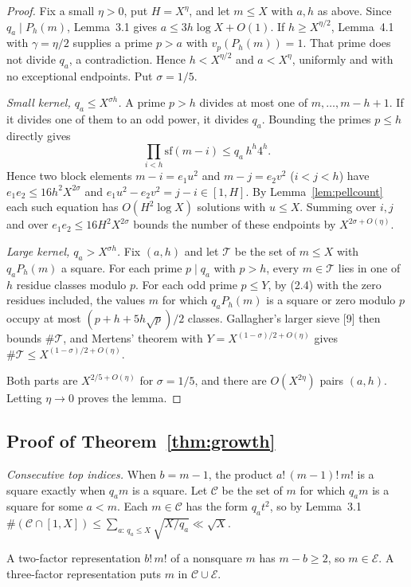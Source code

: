 \documentclass[letterpaper]{article}
\theoremstyle{definition}
\theoremstyle{remark}
\numberwithin{equation}{section}
\begin{document}
\begin{proof}
Fix a small $\eta>0$, put $H=X^\eta$, and let $m\le X$ with $a,h$ as above. Since $q_a\mid P_h(m)$,
Lemma~3.1 gives $a\le 3h\log X+O(1)$. If $h\ge X^{\eta/2}$, Lemma~4.1 with $\gamma=\eta/2$ supplies
a prime $p>a$ with $v_p(P_h(m))=1$. That prime does not divide $q_a$, a contradiction. Hence
$h<X^{\eta/2}$ and $a<X^{\eta}$, uniformly and with no exceptional endpoints. Put $\sigma=1/5$.

\emph{Small kernel, $q_a\le X^{\sigma h}$.} A prime $p>h$ divides at most one of $m,\dots,m-h+1$.
If it divides one of them to an odd power, it divides $q_a$. Bounding the primes $p\le h$ directly gives
\[ \prod_{i<h}\mathrm{sf}(m-i)\le q_a\,h^h4^h. \]
Hence two block elements $m-i=e_1u^2$ and $m-j=e_2v^2$ ($i<j<h$) have
$e_1e_2\le 16h^2X^{2\sigma}$ and $e_1u^2-e_2v^2=j-i\in[1,H]$. By Lemma~\ref{lem:pellcount} each such
equation has $O(H^2\log X)$ solutions with $u\le X$. Summing over $i,j$ and over
$e_1e_2\le 16H^2X^{2\sigma}$ bounds the number of these endpoints by $X^{2\sigma+O(\eta)}$.

\emph{Large kernel, $q_a>X^{\sigma h}$.} Fix $(a,h)$ and let $\mathcal T$ be the set of $m\le X$ with
$q_aP_h(m)$ a square. For each prime $p\mid q_a$ with $p>h$, every $m\in\mathcal T$ lies in one of $h$
residue classes modulo $p$. For each odd prime $p\le Y$, by (2.4) with the zero residues included, the
values $m$ for which $q_aP_h(m)$ is a square or zero modulo $p$ occupy at most
$(p+h+5h\sqrt p)/2$ classes. Gallagher's larger sieve [9] then bounds $\#\mathcal T$, and Mertens'
theorem with $Y=X^{(1-\sigma)/2+O(\eta)}$ gives $\#\mathcal T\le X^{(1-\sigma)/2+O(\eta)}$.

Both parts are $X^{2/5+O(\eta)}$ for $\sigma=1/5$, and there are $O(X^{2\eta})$ pairs $(a,h)$.
Letting $\eta\to 0$ proves the lemma.
\end{proof}

\subsection{Proof of Theorem~\ref{thm:growth}}

\emph{Consecutive top indices.} When $b=m-1$, the product $a!\,(m-1)!\,m!$ is a square exactly when
$q_am$ is a square. Let $\mathcal C$ be the set of $m$ for which $q_am$ is a square for some $a<m$.
Each $m\in\mathcal C$ has the form $q_at^2$, so by Lemma~3.1
$\#(\mathcal C\cap[1,X])\le\sum_{a:\,q_a\le X}\sqrt{X/q_a}\ll\sqrt X$.

A two-factor representation $b!\,m!$ of a nonsquare $m$ has $m-b\ge 2$, so $m\in\mathcal E$.
A three-factor representation puts $m$ in $\mathcal C\cup\mathcal E$.
\end{document}
